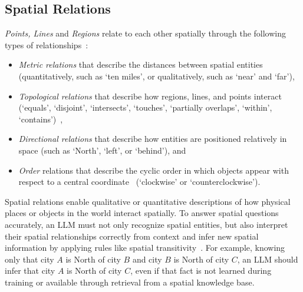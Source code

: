 \subsection{Spatial Relations}
\textit{Points, Lines} and \textit{Regions} relate to each other spatially through the following types of relationships~\cite{Carniel2020,Bertella2022,Carniel2023}: 
\begin{itemize}
    \item \textit{Metric relations} that describe the distances between spatial entities (quantitatively, such as `ten miles', or qualitatively, such as `near' and `far'),
    \item \textit{Topological relations} that describe how regions, lines, and points interact (`equals', `disjoint', `intersects', `touches', `partially overlaps', `within', `contains')~\cite{Minervino2023,Clementini1994,Strobl2008}, 
    \item \textit{Directional relations} that describe how entities are positioned relatively in space (such as `North', `left', or `behind'), and
    \item \textit{Order} relations that describe the cyclic order in which objects appear with respect to a central coordinate~\cite{Schwering2014} (`clockwise' or `counterclockwise').
\end{itemize}


Spatial relations enable qualitative or quantitative descriptions of how physical places or objects in the world interact spatially.
To answer spatial questions accurately, an LLM must not only recognize spatial entities, but also interpret their spatial relationships correctly from context and infer new spatial information by applying rules like spatial transitivity~\cite{Pears1990}.
For example, knowing only that city $A$ is North of city $B$ and city $B$ is North of city $C$, an LLM should infer that city $A$ is North of city $C$, even if that fact is not learned during training or available through retrieval from a spatial knowledge base.
